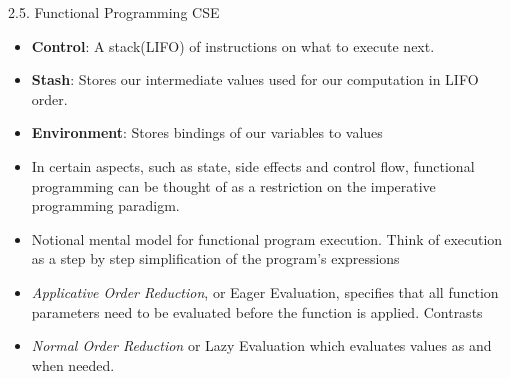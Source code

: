 \begin{center}
     \Large{2.5. Functional Programming CSE}
\end{center}
\begin{itemize}
    \item \textbf{Control}: A stack(LIFO) of instructions on what to execute next.
    \item \textbf{Stash}: Stores our intermediate values used for our computation in LIFO order.
    \item \textbf{Environment}: Stores bindings of our variables to values
    \item In certain aspects, such as state, side effects and control flow, functional programming can be thought of as a restriction on the imperative programming paradigm.
    \item Notional mental model for functional program execution. Think of execution as a step by step simplification of the program's expressions
    \item \textit{Applicative Order Reduction}, or Eager Evaluation, specifies that all function parameters need to be evaluated before the function is applied. Contrasts \item \textit{Normal Order Reduction} or Lazy Evaluation which evaluates values as and when needed.
\end{itemize}



